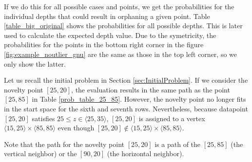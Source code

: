 If we do this for all possible cases and points, we get the probabilities for the individual depths that could result in orphaning a given point. Table \ref{table_big_original} shows the probabilities for all possible depths. This is later used to calculate the expected depth value.
Due to the symetricity, the probabilities for the points in the bottom right corner in the figure \ref{fig:example_noutlier_gnu} are the same as those in the top left corner, so we only show the latter.

Let us recall the initial problem in Section \ref{sec:InitialProblem}.
If we consider the novelty point $[25,20]$, the evaluation results in the same path as the point $[25,85]$ in Table \ref{prob_table_25_85}. However, the novelty point no longer fits in the start space for the sixth and seventh rows. Nevertheless, because datapoint $[25,20]$ satisfies  $25 \le z \in \langle 25, 35 \rangle$,  $[25,20]$ is assigned to a vertex $\langle 15, 25 \rangle \times \langle 85, 85 \rangle$ even though $[25,20] \notin \langle 15, 25 \rangle \times \langle 85, 85 \rangle$.

Note that the path for the novelty point $[25,20]$ is a path of the $[25,85]$ (the vertical neighbor) or the $[90,20]$ (the horizontal neighbor).



